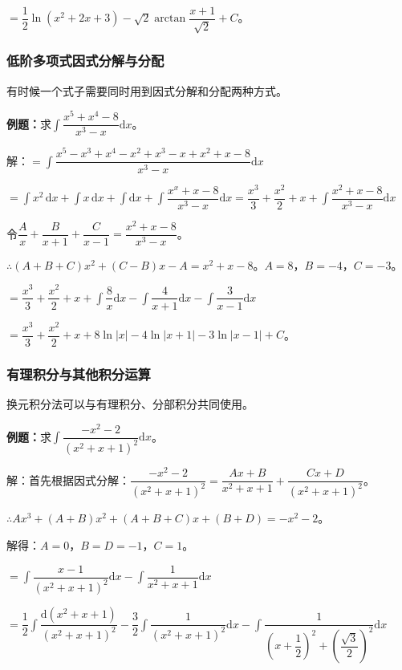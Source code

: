 \documentclass[UTF8, 12pt]{ctexart}
\begin{document}
$=\dfrac{1}{2}\ln(x^2+2x+3)-\sqrt{2}\arctan\dfrac{x+1}{\sqrt{2}}+C$。

\subsubsection{低阶多项式因式分解与分配}

有时候一个式子需要同时用到因式分解和分配两种方式。

\textbf{例题：}求$\displaystyle{\int\dfrac{x^5+x^4-8}{x^3-x}\textrm{d}x}$。

解：$=\displaystyle{\int\dfrac{x^5-x^3+x^4-x^2+x^3-x+x^2+x-8}{x^3-x}\textrm{d}x}$

$=\int x^2\,\textrm{d}x+\int x\,\textrm{d}x+\int\textrm{d}x+\displaystyle{\int\dfrac{x^x+x-8}{x^3-x}\textrm{d}x}=\dfrac{x^3}{3}+\dfrac{x^2}{2}+x+\displaystyle{\int\dfrac{x^2+x-8}{x^3-x}\textrm{d}x}$

令$\dfrac{A}{x}+\dfrac{B}{x+1}+\dfrac{C}{x-1}=\dfrac{x^2+x-8}{x^3-x}$。

$\therefore(A+B+C)x^2+(C-B)x-A=x^2+x-8$。$A=8$，$B=-4$，$C=-3$。

$=\dfrac{x^3}{3}+\dfrac{x^2}{2}+x+\displaystyle{\int\dfrac{8}{x}\textrm{d}x-\int\dfrac{4}{x+1}\textrm{d}x-\int\dfrac{3}{x-1}\textrm{d}x}$

$=\dfrac{x^3}{3}+\dfrac{x^2}{2}+x+8\ln\vert x\vert-4\ln\vert x+1\vert-3\ln\vert x-1\vert+C$。

\subsubsection{有理积分与其他积分运算}

换元积分法可以与有理积分、分部积分共同使用。

\textbf{例题：}求$\displaystyle{\int\dfrac{-x^2-2}{(x^2+x+1)^2}\textrm{d}x}$。

解：首先根据因式分解：$\dfrac{-x^2-2}{(x^2+x+1)^2}=\dfrac{Ax+B}{x^2+x+1}+\dfrac{Cx+D}{(x^2+x+1)^2}$。

$\therefore Ax^3+(A+B)x^2+(A+B+C)x+(B+D)=-x^2-2$。

解得：$A=0$，$B=D=-1$，$C=1$。

$=\displaystyle{\int\dfrac{x-1}{(x^2+x+1)^2}\textrm{d}x-\int\dfrac{1}{x^2+x+1}\textrm{d}x}$

$=\displaystyle{\dfrac{1}{2}\int\dfrac{\textrm{d}(x^2+x+1)}{(x^2+x+1)^2}-\dfrac{3}{2}\int\dfrac{1}{(x^2+x+1)^2}\textrm{d}x-\int\dfrac{1}{\left(x+\dfrac{1}{2}\right)^2+\left(\dfrac{\sqrt{3}}{2}\right)^2}\textrm{d}x}$
\end{document}
